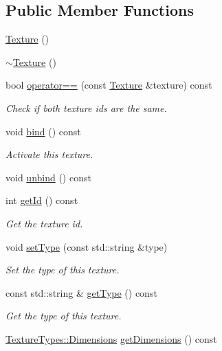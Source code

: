 \subsection*{Public Member Functions}
\begin{DoxyCompactItemize}
\item 
\mbox{\hyperlink{classec_1_1_texture_ac2551ef676d0c771f35dc470b8a0b237}{Texture}} ()
\item 
\mbox{\hyperlink{classec_1_1_texture_ae567d80654dd09c6b02a38ca8de29ead}{$\sim$\+Texture}} ()
\item 
bool \mbox{\hyperlink{classec_1_1_texture_ab00e335380881f3267732186381c777c}{operator==}} (const \mbox{\hyperlink{classec_1_1_texture}{Texture}} \&texture) const
\begin{DoxyCompactList}\small\item\em Check if both texture ids are the same. \end{DoxyCompactList}\item 
void \mbox{\hyperlink{classec_1_1_texture_a9e2f0191cfcc85c87edb821508cc06ee}{bind}} () const
\begin{DoxyCompactList}\small\item\em Activate this texture. \end{DoxyCompactList}\item 
void \mbox{\hyperlink{classec_1_1_texture_a95c72abc5c801df231fc970c6adffdcc}{unbind}} () const
\item 
int \mbox{\hyperlink{classec_1_1_texture_a0097b0b1826d7339ae109a187b6304d5}{get\+Id}} () const
\begin{DoxyCompactList}\small\item\em Get the texture id. \end{DoxyCompactList}\item 
void \mbox{\hyperlink{classec_1_1_texture_a4d984f43478753facd81186d1cd36bcb}{set\+Type}} (const std\+::string \&type)
\begin{DoxyCompactList}\small\item\em Set the type of this texture. \end{DoxyCompactList}\item 
const std\+::string \& \mbox{\hyperlink{classec_1_1_texture_a1c33bc610c0b5c7807fa92897320349f}{get\+Type}} () const
\begin{DoxyCompactList}\small\item\em Get the type of this texture. \end{DoxyCompactList}\item 
\mbox{\hyperlink{structec_1_1_texture_types_ac0e07f24452fa28dd8e6e33a224842fc}{Texture\+Types\+::\+Dimensions}} \mbox{\hyperlink{classec_1_1_texture_a5d1e6d8dd6c98ea036caf2696e47637a}{get\+Dimensions}} () const

\end{DoxyCompactItemize}
